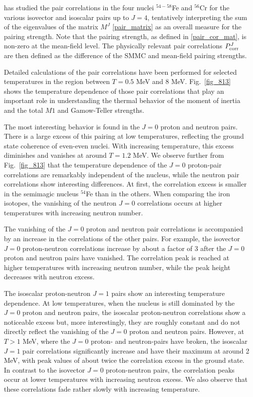 \documentclass[rmp,aps,floatfix]{revtex4}
\begin{document}
\cite{Langanke95b}
has studied the pair correlations in the four nuclei
$^{54-58}$Fe and $^{56}$Cr for the various
isovector and isoscalar pairs up to $J=4$,
tentatively interpreting
the sum
of the eigenvalues of the matrix $M^J$ \ref{pair_matrix}
as an overall measure for the pairing strength.
Note that
the pairing strength, as defined in \ref{pair_cor_mat},
is non-zero at the
mean-field level. The physically relevant pair correlations
$P_{\rm corr}^J$ are then defined as the difference of the SMMC
and mean-field pairing strengths.

Detailed calculations of the pair correlations have been
performed for selected temperatures in the region between $T=0.5$ MeV and 8
MeV.
Fig.~\ref{fig_813} shows the
temperature dependence of those pair correlations
that
play an important role in
understanding the thermal behavior of the moment of inertia and the
total $M1$ and Gamow-Teller strengths.



The most interesting behavior is found in the $J=0$ proton and neutron pairs.
There is a large excess of this pairing at low
temperatures, reflecting the ground state coherence of even-even nuclei.
With increasing temperature, this excess diminishes and vanishes at
around $T=1.2$ MeV.
We observe further from Fig.~\ref{fig_813} that the temperature dependence
of the $J=0$ proton-pair correlations are remarkably independent
of the nucleus, while the neutron pair correlations show interesting
differences. At first, the correlation excess is smaller in the semimagic
nucleus $^{54}$Fe than in the others. When comparing the iron isotopes, the
vanishing of the neutron $J=0$ correlations occurs at higher temperatures
with increasing neutron number.

The vanishing of the $J=0$ proton and neutron pair correlations is
accompanied by an  increase in the correlations of the other pairs.
For example, the isovector $J=0$ proton-neutron correlations
increase by about a factor of 3 after the $J=0$
proton and neutron pairs have vanished. The correlation peak is reached
at higher temperatures with increasing neutron number,
while the
peak height decreases with neutron excess.

The isoscalar proton-neutron $J=1$ pairs show an interesting temperature
dependence. At low temperatures, when the nucleus is still dominated
by the $J=0$ proton and neutron pairs, the isoscalar proton-neutron
correlations show a
noticeable excess but, more interestingly, they are roughly constant and
do not directly reflect  the vanishing of the $J=0$ proton and neutron pairs.
However, at $T>1$ MeV, where the $J=0$ proton- and neutron-pairs have broken,
the isoscalar
$J=1$ pair correlations significantly increase and have their maximum
at around 2 MeV, with peak values of about twice the correlation excess
in the ground state.
In contrast to the isovector $J=0$ proton-neutron pairs, the correlation peaks
occur at lower temperatures with increasing neutron excess. We also
observe that these correlations fade rather slowly with
increasing temperature.
\end{document}
